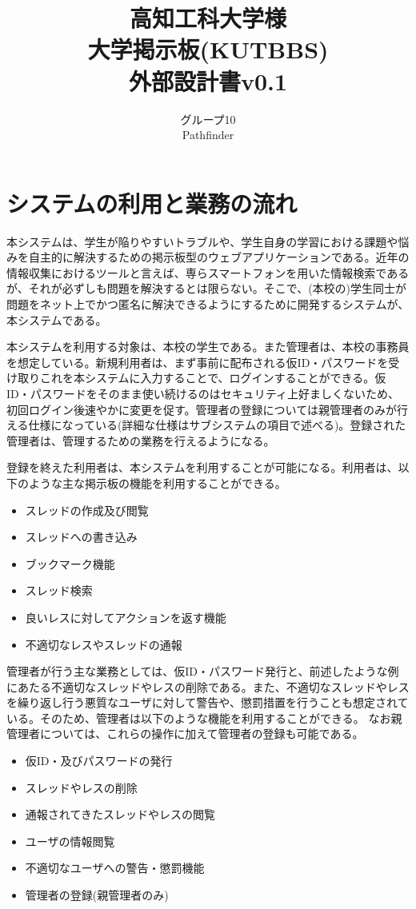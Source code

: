 \documentclass[a4j]{jarticle}
\title{
\vspace{30mm}
{\bf 高知工科大学様}
\\
\vspace{5mm}
大学掲示板(KUTBBS)\\
\vspace{5mm}
{\bf  外部設計書v0.1}
\vspace{90mm}
}
\author{
\vspace{5mm}
グループ10 \\
\vspace{5mm}
Pathfinder \\
\vspace{5mm}
\vspace{10mm}
}
\begin{document}
\maketitle
\tableofcontents
\newpage




\section{システムの利用と業務の流れ}
本システムは、学生が陥りやすいトラブルや、学生自身の学習における課題や悩みを自主的に解決するための掲示板型のウェブアプリケーションである。近年の情報収集におけるツールと言えば、専らスマートフォンを用いた情報検索であるが、それが必ずしも問題を解決するとは限らない。そこで、(本校の)学生同士が問題をネット上でかつ匿名に解決できるようにするために開発するシステムが、本システムである。



本システムを利用する対象は、本校の学生である。また管理者は、本校の事務員を想定している。新規利用者は、まず事前に配布される仮ID・パスワードを受け取りこれを本システムに入力することで、ログインすることができる。仮ID・パスワードをそのまま使い続けるのはセキュリティ上好ましくないため、初回ログイン後速やかに変更を促す。管理者の登録については親管理者のみが行える仕様になっている(詳細な仕様はサブシステムの項目で述べる)。登録された管理者は、管理するための業務を行えるようになる。


登録を終えた利用者は、本システムを利用することが可能になる。利用者は、以下のような主な掲示板の機能を利用することができる。
\begin{itemize}
  \item スレッドの作成及び閲覧
  \item スレッドへの書き込み
  \item ブックマーク機能
  \item スレッド検索
  \item 良いレスに対してアクションを返す機能
  \item 不適切なレスやスレッドの通報
\end{itemize}



管理者が行う主な業務としては、仮ID・パスワード発行と、前述したような例にあたる不適切なスレッドやレスの削除である。また、不適切なスレッドやレスを繰り返し行う悪質なユーザに対して警告や、懲罰措置を行うことも想定されている。そのため、管理者は以下のような機能を利用することができる。
なお親管理者については、これらの操作に加えて管理者の登録も可能である。

\begin{itemize}
  \item 仮ID・及びパスワードの発行
  \item スレッドやレスの削除
  \item 通報されてきたスレッドやレスの閲覧
  \item ユーザの情報閲覧
  \item 不適切なユーザへの警告・懲罰機能
  \item 管理者の登録(親管理者のみ)
\end{itemize}
\end{document}
